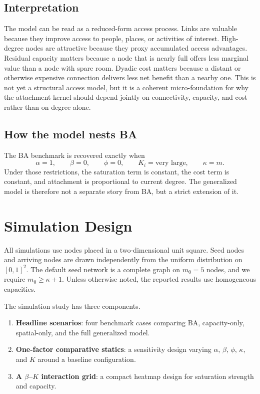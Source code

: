 \documentclass[11pt]{article}
\begin{document}
\subsection{Interpretation}

The model can be read as a reduced-form access process. Links are valuable because they improve access to people, places, or activities of interest. High-degree nodes are attractive because they proxy accumulated access advantages. Residual capacity matters because a node that is nearly full offers less marginal value than a node with spare room. Dyadic cost matters because a distant or otherwise expensive connection delivers less net benefit than a nearby one. This is not yet a structural access model, but it is a coherent micro-foundation for why the attachment kernel should depend jointly on connectivity, capacity, and cost rather than on degree alone.

\subsection{How the model nests BA}

The BA benchmark is recovered exactly when
\[
\alpha = 1, \qquad \beta = 0, \qquad \phi = 0, \qquad K_i = \text{very large}, \qquad \kappa = m.
\]
Under those restrictions, the saturation term is constant, the cost term is constant, and attachment is proportional to current degree. The generalized model is therefore not a separate story from BA, but a strict extension of it.

\section{Simulation Design}
\label{sec:design}

All simulations use nodes placed in a two-dimensional unit square. Seed nodes and arriving nodes are drawn independently from the uniform distribution on $[0,1]^2$. The default seed network is a complete graph on $m_0=5$ nodes, and we require $m_0 \ge \kappa + 1$. Unless otherwise noted, the reported results use homogeneous capacities.

The simulation study has three components.
\begin{enumerate}[leftmargin=1.5em]
    \item \textbf{Headline scenarios}: four benchmark cases comparing BA, capacity-only, spatial-only, and the full generalized model.
    \item \textbf{One-factor comparative statics}: a sensitivity design varying $\alpha$, $\beta$, $\phi$, $\kappa$, and $K$ around a baseline configuration.
    \item \textbf{A $\beta$--$K$ interaction grid}: a compact heatmap design for saturation strength and capacity.
\end{enumerate}
\end{document}

